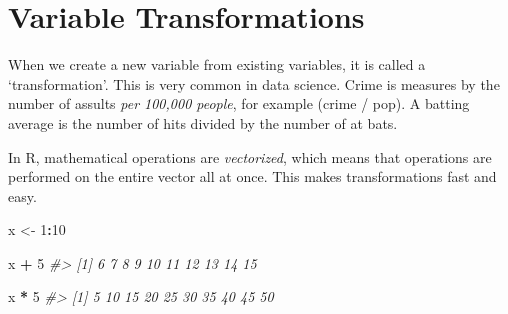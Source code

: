 \documentclass[]{book}
\newenvironment{Shaded}{\begin{snugshade}}{\end{snugshade}}
\newcommand{\CommentTok}[1]{\textcolor[rgb]{0.56,0.35,0.01}{\textit{#1}}}
\newcommand{\DataTypeTok}[1]{\textcolor[rgb]{0.13,0.29,0.53}{#1}}
\newcommand{\DecValTok}[1]{\textcolor[rgb]{0.00,0.00,0.81}{#1}}
\newcommand{\KeywordTok}[1]{\textcolor[rgb]{0.13,0.29,0.53}{\textbf{#1}}}
\newcommand{\NormalTok}[1]{#1}
\newcommand{\OperatorTok}[1]{\textcolor[rgb]{0.81,0.36,0.00}{\textbf{#1}}}
\newcommand{\StringTok}[1]{\textcolor[rgb]{0.31,0.60,0.02}{#1}}
\theoremstyle{definition}
\theoremstyle{definition}
\theoremstyle{definition}
\theoremstyle{remark}
\begin{document}
\begin{Shaded}
\end{Shaded}

\hypertarget{variable-transformations}{%
\section{Variable Transformations}\label{variable-transformations}}

When we create a new variable from existing variables, it is called a
`transformation'. This is very common in data science. Crime is measures
by the number of assults \emph{per 100,000 people}, for example (crime /
pop). A batting average is the number of hits divided by the number of
at bats.

In R, mathematical operations are \emph{vectorized}, which means that
operations are performed on the entire vector all at once. This makes
transformations fast and easy.

\begin{Shaded}
\begin{Highlighting}[]

\NormalTok{x <-}\StringTok{ }\DecValTok{1}\OperatorTok{:}\DecValTok{10}

\NormalTok{x }\OperatorTok{+}\StringTok{ }\DecValTok{5}
\CommentTok{#>  [1]  6  7  8  9 10 11 12 13 14 15}

\NormalTok{x }\OperatorTok{*}\StringTok{ }\DecValTok{5}
\CommentTok{#>  [1]  5 10 15 20 25 30 35 40 45 50}
\end{Highlighting}
\end{Shaded}
\end{document}
